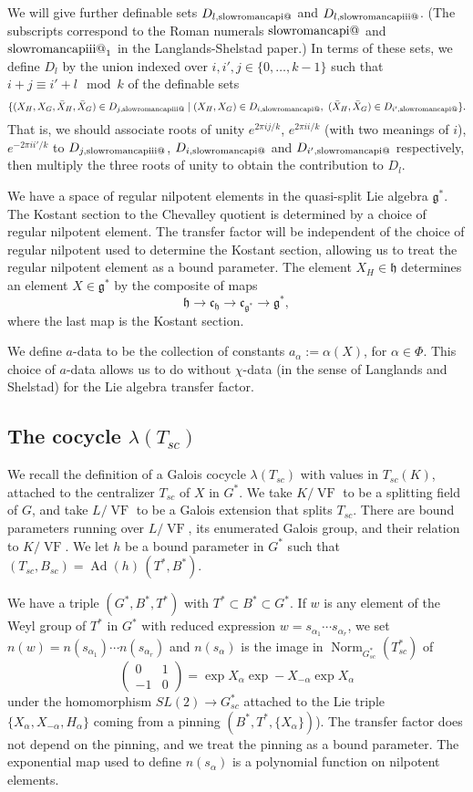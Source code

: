 \documentclass[12pt]{amsart}
\makeatletter
\newcommand*{\rom}[1]{\text{\expandafter\@slowromancap\romannumeral #1@}}
\newcommand{\op}[1]{\operatorname{#1}}
\def\VF{{\op{VF}}}
\newcommand{\fg}{\mathfrak{g}}
\newcommand{\fc}{\mathfrak{c}}
\newcommand{\fh}{\mathfrak{h}}
\theoremstyle{plain}
\theoremstyle{definition}
\makeatother
\begin{document}
We will give further definable sets $D_{l,{\rom{1}}}$ and $D_{l,\rom{3}}$.  (The
subscripts
correspond to the Roman numerals $\rom1$ and $\rom3_1$ in the
Langlands-Shelstad paper.) In terms
of these sets, we define $D_l$ by the union indexed over
$i,i',j\in\{0,\ldots,k-1 \}$ such that $i + j \equiv i' + l\mod k$
of the definable sets
\[
\{(X_H,X_G,\bar X_H,\bar X_G) \in D_{j,\rom{3}} \mid 
(X_H,X_G)\in D_{i,\rom1},~ (\bar X_H,\bar X_G)\in D_{ i',\rom1}\}.
\]
That is, we should associate roots of unity
$e^{2\pi i j/k}$, $e^{2\pi i i/k}$ (with two meanings of $i$), $e^{-2\pi i i'/k}$ to 
$D_{j,\rom{3}}$, $D_{i,\rom1}$ and $D_{i',\rom1}$ respectively, then multiply
the three roots of unity to obtain the contribution to $D_l$.


We have a space of regular nilpotent elements in the quasi-split Lie
algebra $\fg^*$.  The Kostant section \cite{Kott} to the Chevalley
quotient is determined by a choice of regular nilpotent element.  The
transfer factor will be independent of the choice of regular nilpotent
used to determine the Kostant section, allowing us to treat the
regular nilpotent element as a bound parameter.  The element $X_H\in
\fh$ determines an element $X\in \fg^*$ by the composite of maps
\[
\fh \to \fc_{\fh} \to \fc_{\fg^*} \to \fg^*,
\]
where the last map is the Kostant section.  

We define $a$-data to be the collection of constants $a_\alpha:=
\alpha(X)$, for $\alpha\in \Phi$.  This choice of $a$-data allows us
to do without $\chi$-data (in the sense of Langlands and Shelstad) for
the Lie algebra transfer factor.

\subsection{The cocycle $\lambda(T_{sc})$}

We recall the definition of a Galois cocycle $\lambda(T_{sc})$ with
values in $T_{sc}(K)$, attached to the centralizer $T_{sc}$ of $X$ in
$G^*$.  We take $K/\VF$ to be a splitting field of $G$, and take
$L/\VF$ to be a Galois extension that splits $T_{sc}$.  There are
bound parameters running over $L/\VF$, its enumerated Galois group,
and their relation to $K/\VF$.  We let $h$ be a bound parameter in
$G^*$ such that $(T_{sc},B_{sc}) = \op{Ad}(h)\,(T^*,B^*)$.

We have a triple $(G^*,B^*,T^*)$ with $T^*\subset B^*\subset G^*$.  If
$w$ is any element of the Weyl group of $T^*$ in $G^*$ with reduced
expression $w = s_{\alpha_1}\cdots s_{\alpha_r}$, we set $n(w) =
n(s_{\alpha_1})\cdots n(s_{\alpha_r})$ and $n(s_\alpha)$ is the image
in $\op{Norm}_{G_{sc}^*}(T_{sc}^*)$ of
\[
\begin{pmatrix}0 &1\\ -1 & 0\end{pmatrix} = \op{exp} X_\alpha \op{exp} -
  X_{-\alpha} \op{exp} X_\alpha
\]
under the homomorphism $SL(2)\to G^*_{sc}$ attached to the Lie triple
$\{X_\alpha,X_{-\alpha},H_\alpha\}$ coming from a pinning
$(B^*,T^*,\{X_\alpha\})$).  The transfer factor does not depend on the
pinning, and we treat the pinning as a bound parameter.  The
exponential map used to define $n(s_\alpha)$ is a polynomial function
on nilpotent elements.
\end{document}
